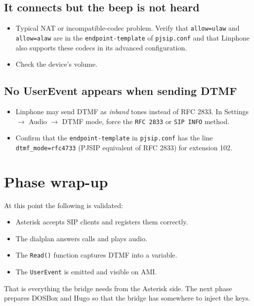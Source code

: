 \subsection{It connects but the beep is not heard}

\begin{itemize}
  \item Typical NAT or incompatible-codec problem. Verify that \texttt{allow=ulaw} and \texttt{allow=alaw} are in the \texttt{endpoint-template} of \texttt{pjsip.conf} and that Linphone also supports these codecs in its advanced configuration.
  \item Check the device's volume.
\end{itemize}

\subsection{No UserEvent appears when sending DTMF}

\begin{itemize}
  \item Linphone may send DTMF as \emph{inband} tones instead of RFC 2833. In \textsf{Settings} $\to$ \textsf{Audio} $\to$ \textsf{DTMF mode}, force the \texttt{RFC 2833} or \texttt{SIP INFO} method.
  \item Confirm that the \texttt{endpoint-template} in \texttt{pjsip.conf} has the line \texttt{dtmf\_mode=rfc4733} (PJSIP equivalent of RFC 2833) for extension 102.
\end{itemize}

\section{Phase wrap-up}

At this point the following is validated:

\begin{itemize}
  \item Asterisk accepts SIP clients and registers them correctly.
  \item The dialplan answers calls and plays audio.
  \item The \texttt{Read()} function captures DTMF into a variable.
  \item The \texttt{UserEvent} is emitted and visible on AMI.
\end{itemize}

That is everything the bridge needs from the Asterisk side. The next phase prepares DOSBox and Hugo so that the bridge has somewhere to inject the keys.
